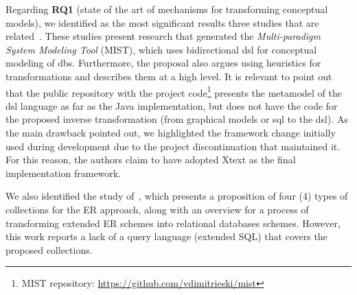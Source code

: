 Regarding \textbf{RQ1} (state of the art of mechanisms for transforming conceptual models), we identified as the most significant results three studies that are related~\cite{Ristic:2016, Dimitrieski:2015, Dimitrieski:2014}.
These studies present research that generated the \textit{Multi-paradigm System Modeling Tool} (MIST), which uses bidirectional \ac{dsl} for conceptual modeling of \acp{db}.
Furthermore, the proposal also argues using heuristics for transformations and describes them at a high level.
It is relevant to point out that the public repository with the project code\footnote{MIST repository: \url{https://github.com/vdimitrieski/mist}} presents the metamodel of the \ac{dsl} language as far as the Java implementation, but does not have the code for the proposed inverse transformation (from graphical models or \ac{sql} to the \ac{dsl}).
As the main drawback pointed out, we highlighted the framework change initially used during development due to the project discontinuation that maintained it.
For this reason, the authors claim to have adopted Xtext as the final implementation framework.

We also identified the study of~\cite{Hartmann:2007}, which presents a proposition of four (4) types of collections for the ER approach, along with an overview for a process of
transforming extended ER schemes into relational databases schemes.
However, this work reports a lack of a query language (extended SQL) that covers the proposed collections.

